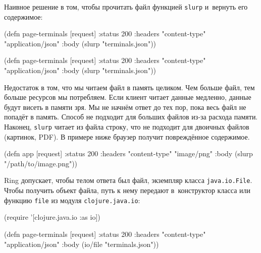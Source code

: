 
Наивное решение в том, чтобы прочитать файл функцией \verb|slurp| и~вернуть
его содержимое:

\ifx\DEVICETYPE\MOBILE

\begin{english}
  \begin{clojure}
(defn page-terminals [request]
  {:status 200
   :headers
   {"content-type" "application/json"}
   :body (slurp "terminals.json")})
  \end{clojure}
\end{english}

\else

\begin{english}
  \begin{clojure}
(defn page-terminals [request]
  {:status 200
   :headers {"content-type" "application/json"}
   :body (slurp "terminals.json")})
  \end{clojure}
\end{english}

\fi

Недостаток в том, что мы читаем файл в память целиком. Чем больше файл, тем
больше ресурсов мы потребляем. Если клиент читает данные медленно, данные будут
висеть в памяти зря. Мы не начнём ответ до тех пор, пока весь файл не
попадёт в память. Способ не подходит для больших файлов из-за расхода
памяти. Наконец, \verb|slurp| читает из файла строку, что не подходит для
двоичных файлов (картинок, PDF). В примере ниже браузер получит повреждённое
содержимое.

\begin{english}
  \begin{clojure}
(defn app [request]
  {:status 200
   :headers {"content-type" "image/png"}
   :body (slurp "/path/to/image.png")})
  \end{clojure}
\end{english}


Ring допускает, чтобы телом ответа был файл, экземпляр класса
\verb|java.io.File|. Чтобы получить объект файла, путь к нему передают
в~конструктор класса или функцию \verb|file| из модуля \verb|clojure.java.io|:

\ifx\DEVICETYPE\MOBILE

\begin{english}
  \begin{clojure}
(require '[clojure.java.io :as io])

(defn page-terminals
  [request]
  {:status 200
   :headers
   {"content-type" "application/json"}
   :body (io/file "terminals.json")})
  \end{clojure}
\end{english}

